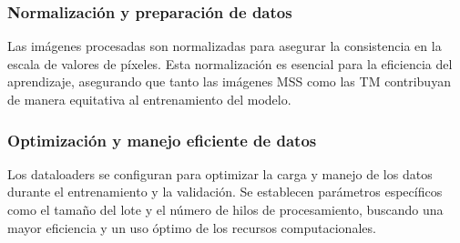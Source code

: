             \subsubsection{Normalización y preparación de datos} 
                Las imágenes procesadas son normalizadas para asegurar la consistencia en la escala de valores de píxeles. Esta normalización es esencial para la eficiencia del aprendizaje, asegurando que tanto las imágenes MSS como las TM contribuyan de manera equitativa al entrenamiento del modelo. 
            
            \subsubsection{Optimización y manejo eficiente de datos} 
                Los dataloaders se configuran para optimizar la carga y manejo de los datos durante el entrenamiento y la validación. Se establecen parámetros específicos como el tamaño del lote y el número de hilos de procesamiento, buscando una mayor eficiencia y un uso óptimo de los recursos computacionales.
            
